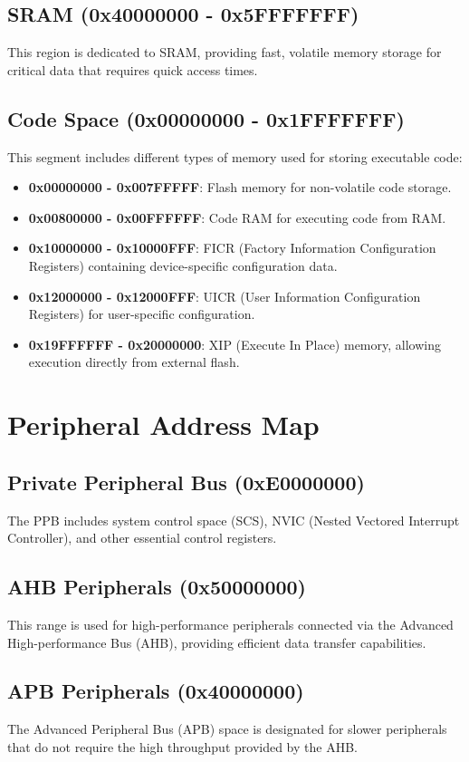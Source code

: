 \documentclass{Configuration_Files/PoliMi3i_thesis}
\begin{document}
\subsection{SRAM (0x40000000 - 0x5FFFFFFF)}
This region is dedicated to SRAM, providing fast, volatile memory storage for critical data that requires quick access times.

\subsection{Code Space (0x00000000 - 0x1FFFFFFF)}
This segment includes different types of memory used for storing executable code:
\begin{itemize}
    \item \textbf{0x00000000 - 0x007FFFFF}: Flash memory for non-volatile code storage.
    \item \textbf{0x00800000 - 0x00FFFFFF}: Code RAM for executing code from RAM.
    \item \textbf{0x10000000 - 0x10000FFF}: FICR (Factory Information Configuration Registers) containing device-specific configuration data.
    \item \textbf{0x12000000 - 0x12000FFF}: UICR (User Information Configuration Registers) for user-specific configuration.
    \item \textbf{0x19FFFFFF - 0x20000000}: XIP (Execute In Place) memory, allowing execution directly from external flash.
\end{itemize}

\section{Peripheral Address Map}

\subsection{Private Peripheral Bus (0xE0000000)}
The PPB includes system control space (SCS), NVIC (Nested Vectored Interrupt Controller), and other essential control registers.

\subsection{AHB Peripherals (0x50000000)}
This range is used for high-performance peripherals connected via the Advanced High-performance Bus (AHB), providing efficient data transfer capabilities.

\subsection{APB Peripherals (0x40000000)}
The Advanced Peripheral Bus (APB) space is designated for slower peripherals that do not require the high throughput provided by the AHB.
\end{document}
